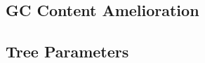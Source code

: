 \documentclass[11pt]{article}
\begin{document}
\subsection{GC Content Amelioration}
%

\subsection{Tree Parameters}
%
%
%
\end{document}
